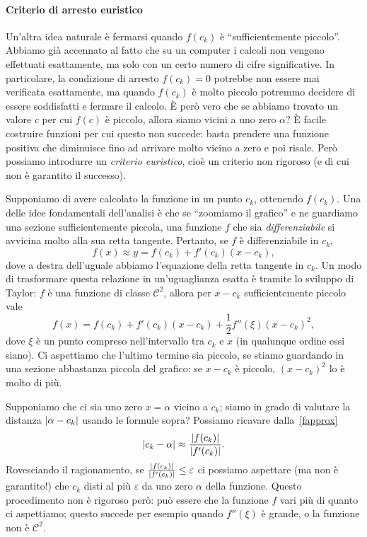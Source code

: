 \documentclass[a4paper]{report}
\DeclarePairedDelimiter{\abs}{\lvert}{\rvert}
\theoremstyle{definiton}
\theoremstyle{remark}
\begin{document}
\paragraph{Criterio di arresto euristico} Un'altra idea naturale è fermarsi quando $f(c_k)$ è ``sufficientemente piccolo''. Abbiamo già accennato al fatto che su un computer i calcoli non vengono effettuati esattamente, ma solo con un certo numero di cifre significative. In particolare, la condizione di arresto $f(c_k) = 0$ potrebbe non essere mai verificata esattamente, ma quando $f(c_k)$ è molto piccolo potremmo decidere di essere soddisfatti e fermare il calcolo. È però vero che se abbiamo trovato un valore $c$ per cui $f(c)$ è piccolo, allora siamo vicini a uno zero $\alpha$? È facile costruire funzioni per cui questo non succede: basta prendere una funzione positiva che diminuisce fino ad arrivare molto vicino a zero e poi risale. Però possiamo introdurre un \emph{criterio euristico}, cioè un criterio non rigoroso (e di cui non è garantito il successo). 

Supponiamo di avere calcolato la funzione in un punto $c_k$, ottenendo $f(c_k)$. Una delle idee fondamentali dell'analisi è che se ``zoomiamo il grafico'' e ne guardiamo una sezione sufficientemente piccola, una funzione $f$ che sia \emph{differenziabile} si avvicina molto alla sua retta tangente. Pertanto, se $f$ è differenziabile in $c_k$,
\begin{equation} \label{fapprox}
    f(x) \approx y = f(c_k) + f'(c_k)(x-c_k),
\end{equation}
dove a destra dell'uguale abbiamo l'equazione della retta tangente in $c_k$. Un modo di trasformare questa relazione in un'uguaglianza esatta è tramite lo sviluppo di Taylor: $f$ è una funzione di classe $\mathcal{C}^2$, allora per $x-c_k$ sufficientemente piccolo vale
\[
    f(x) = f(c_k) + f'(c_k)(x-c_k) + \frac{1}{2}f''(\xi) (x-c_k)^2,
\]
dove $\xi$ è un punto compreso nell'intervallo tra $c_k$ e $x$ (in qualunque ordine essi siano). Ci aspettiamo che l'ultimo termine sia piccolo, se stiamo guardando in una sezione abbastanza piccola del grafico: se $x-c_k$ è piccolo, $(x-c_k)^2$ lo è molto di più.

Supponiamo che ci sia uno zero $x = \alpha$ vicino a $c_k$; siamo in grado di valutare la distanza $\abs{\alpha - c_k}$ usando le formule sopra? Possiamo ricavare dalla~\eqref{fapprox}
\[
\abs{c_k-\alpha} \approx \frac{\abs{f(c_k)}}{\abs{f'(c_k)}}.
\]
Rovesciando il ragionamento, se $\frac{\abs{f(c_k)}}{\abs{f'(c_k)}} \leq \varepsilon$ ci possiamo aspettare (ma non è garantito!) che $c_k$ disti al più $\varepsilon$ da uno zero $\alpha$ della funzione. Questo procedimento non è rigoroso però: può essere che la funzione $f$ vari più di quanto ci aspettiamo; questo succede per esempio quando $f''(\xi)$ è grande, o la funzione non è $\mathcal{C}^2$.
\end{document}
